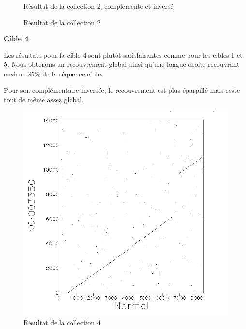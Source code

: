 \begin{figure}[!ht]
\begin{minipage}[c]{.46 \linewidth}
\begin{center}
			Résultat de la collection 2, complémenté et inversé
		\end{center}
	\end{minipage}
	\caption{Résultat de la collection 2}
\end{figure}

\FloatBarrier

\noindent\textbf{Cible 4}

Les résultats pour la cible 4 sont plutôt satisfaisantes comme pour les cibles 1
et 5. Nous obtenons un recouvrement global ainsi qu'une longue droite recouvrant
environ 85\% de la séquence cible.

Pour son complémentaire inversée, le recouvrement est plus éparpillé mais reste
tout de même assez global.

\begin{figure}[!ht]
	\begin{minipage}[r]{.46\linewidth}
		\begin{center}
		\includegraphics[scale= 0.4]{../res/cible4.png}
		Résultat de la collection 4
	\end{center}
\end{minipage} \hfill
\begin{minipage}[c]{.46 \linewidth}
	\begin{center}

\end{center}
\end{minipage}
\end{figure}
